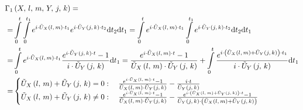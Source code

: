 \begin{equation}
    \label{eq:time-ordered-integral-part1}
    \begin{split}
        \Gamma_1 &\left(X,\,l,\,m,\,Y,\,j,\,k\right) = \\=&\int\limits_0^t  \int\limits_0^{t_1}
        e^{
            i \cdot \tilde{U}_\text{$X$}\left(l,\,m\right) \cdot t_1
        }
        e^{
            i \cdot \tilde{U}_\text{$Y$}\left(j,\,k\right) \cdot t_2
        }
        \mathrm{d}t_2
        \mathrm{d}t_1 = 
        \int\limits_0^t 
        e^{
            i \cdot \tilde{U}_\text{$X$}\left(l,\,m\right) \cdot t_1
        }
        \int\limits_0^{t_1}
        e^{
            i \cdot \tilde{U}_\text{$Y$}\left(j,\,k\right) \cdot t_2
        }
        \mathrm{d}t_2
        \mathrm{d}t_1 \\=
        &\int\limits_0^t 
        e^{
            i \cdot \tilde{U}_\text{$X$}\left(l,\,m\right) \cdot t_1
        }
        \frac{
            e^{
                i \cdot \tilde{U}_\text{$Y$}\left(j,\,k\right) \cdot t
            }
            -1
        }{
            i \cdot\tilde{U}_\text{$Y$}\left(j,\,k\right)
        }
        \mathrm{d}t_1 =
        \frac{
            e^{
                i \cdot \tilde{U}_\text{$X$}\left(l,\,m\right) \cdot t
            }
            -1
        }{
            \tilde{U}_\text{$X$}\left(l,\,m\right) \cdot\tilde{U}_\text{$Y$}\left(j,\,k\right)
        } + 
        \int\limits_0^t 
        \frac{
            e^{
                i \cdot \left(\tilde{U}_\text{$X$}\left(l,\,m\right) + \tilde{U}_\text{$Y$}\left(j,\,k\right) \right) \cdot t_1
            }
        }{
            i \cdot\tilde{U}_\text{$Y$}\left(j,\,k\right)
        }
        \mathrm{d}t_1\\=
        &\begin{cases}
            \tilde{U}_\text{$X$}\left(l,\,m\right) + \tilde{U}_\text{$Y$}\left(j,\,k\right) = 0: \quad
            \frac{
                e^{
                    i \cdot \tilde{U}_\text{$X$}\left(l,\,m\right) \cdot t
                }
                -1
            }{
                \tilde{U}_\text{$X$}\left(l,\,m\right) \cdot\tilde{U}_\text{$Y$}\left(j,\,k\right)
            } - \frac{i \cdot t}{\tilde{U}_\text{$Y$}\left(j,\,k\right)}            \\
            \tilde{U}_\text{$X$}\left(l,\,m\right) + \tilde{U}_\text{$Y$}\left(j,\,k\right) \neq 0: \quad
            \frac{
                e^{
                    i \cdot \tilde{U}_\text{$X$}\left(l,\,m\right) \cdot t
                }
                -1
            }{
                \tilde{U}_\text{$X$}\left(l,\,m\right) \cdot\tilde{U}_\text{$Y$}\left(j,\,k\right)
            } - \frac{
                e^{
                    i \cdot \left(\tilde{U}_\text{$X$}\left(l,\,m\right) + \tilde{U}_\text{$Y$}\left(j,\,k\right) \right) \cdot t
                }
                -1
            }{\tilde{U}_\text{$Y$}\left(j,\,k\right) \cdot \left(\tilde{U}_\text{$X$}\left(l,\,m\right) + \tilde{U}_\text{$Y$}\left(j,\,k\right) \right)}        
        \end{cases}
    \end{split}
\end{equation}



